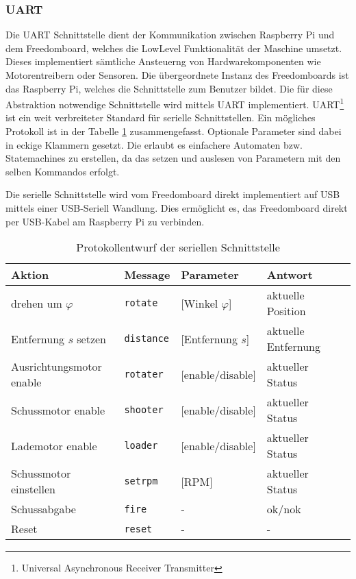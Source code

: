 \subsubsection{UART}
\label{subsub:uart}
Die UART Schnittstelle dient der Kommunikation zwischen Raspberry Pi und
dem Freedomboard, welches die LowLevel Funktionalität der Maschine 
umsetzt. Dieses implementiert sämtliche Ansteuerng von Hardwarekomponenten
wie Motorentreibern oder Sensoren. Die übergeordnete Instanz des Freedomboards
ist das Raspberry Pi, welches die Schnittstelle zum Benutzer bildet. Die für
diese Abstraktion notwendige Schnittstelle wird mittels UART
implementiert. UART\footnote{Universal Asynchronous Receiver Transmitter}
ist ein weit verbreiteter Standard für serielle Schnittstellen.  Ein mögliches
Protokoll ist in der Tabelle \ref{tab:uart}
zusammengefasst. Optionale Parameter sind dabei in eckige Klammern gesetzt.
Die erlaubt es einfachere Automaten bzw. Statemachines zu erstellen, da das
setzen und auslesen von Parametern mit den selben Kommandos erfolgt.

Die serielle Schnittstelle wird vom Freedomboard direkt implementiert auf
USB mittels einer USB-Seriell Wandlung. Dies ermöglicht es, das Freedomboard
direkt per USB-Kabel am Raspberry Pi zu verbinden.

\begin{table}[h!]
	\centering
	\begin{tabular}{l l l l l}
		Aktion & Message & Parameter & Antwort \\
		\hline
		drehen um $\varphi$ 
			& \verb!rotate!
			& [Winkel $\varphi$]
			& aktuelle Position \\
		Entfernung $s$ setzen
			& \verb!distance!
			& [Entfernung $s$]
			& aktuelle Entfernung \\
		Ausrichtungsmotor enable
			& \verb!rotater!
			& [enable/disable]
			& aktueller Status \\
		Schussmotor enable
			& \verb!shooter! 
			& [enable/disable]
			& aktueller Status \\
		Lademotor enable
			& \verb!loader!
			& [enable/disable]
			& aktueller Status \\
		Schussmotor einstellen
			& \verb!setrpm!
			& [RPM]
			& aktueller Status \\
		Schussabgabe
			& \verb!fire!
			& -
			& ok/nok \\
		Reset
			& \verb!reset!
			& -
			& -\\
	\end{tabular}
	\caption{Protokollentwurf der seriellen Schnittstelle}
	\label{tab:uart}
\end{table}

